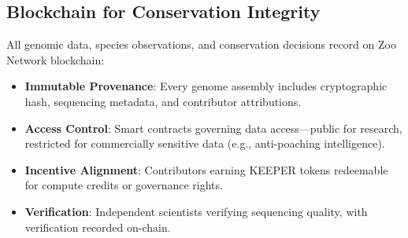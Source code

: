 \subsection{Blockchain for Conservation Integrity}

All genomic data, species observations, and conservation decisions record on Zoo Network blockchain:

\begin{itemize}
    \item \textbf{Immutable Provenance}: Every genome assembly includes cryptographic hash, sequencing metadata, and contributor attributions.
    \item \textbf{Access Control}: Smart contracts governing data access—public for research, restricted for commercially sensitive data (e.g., anti-poaching intelligence).
    \item \textbf{Incentive Alignment}: Contributors earning KEEPER tokens redeemable for compute credits or governance rights.
    \item \textbf{Verification}: Independent scientists verifying sequencing quality, with verification recorded on-chain.
\end{itemize}

